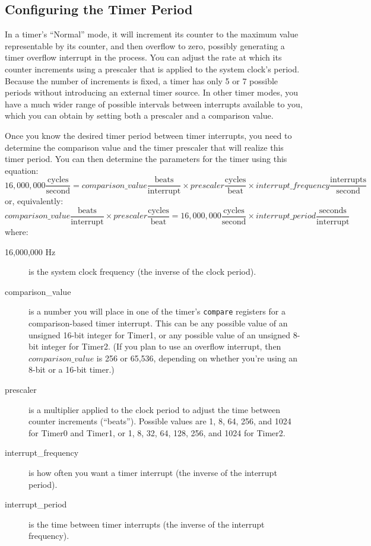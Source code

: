 \subsection{Configuring the Timer Period}

In a timer's ``Normal'' mode, it will increment its counter to the maximum value representable by its counter, and then overflow to zero, possibly generating a timer overflow interrupt in the process.
You can adjust the rate at which its counter increments using a prescaler that is applied to the system clock's period.
Because the number of increments is fixed, a timer has only 5 or 7 possible periods without introducing an external timer source.
In other timer modes, you have a much wider range of possible intervals between interrupts available to you, which you can obtain by setting both a prescaler and a comparison value.

Once you know the desired timer period between timer interrupts, you need to determine the comparison value and the timer prescaler that will realize this timer period.
You can then determine the parameters for the timer using
this equation:
\[
    16,000,000 \frac{\mathrm{cycles}}{\mathrm{second}} =
    comparison\_value \frac{\mathrm{beats}}{\mathrm{interrupt}} \times
    prescaler \frac{\mathrm{cycles}}{\mathrm{beat}} \times
    interrupt\_frequency \frac{\mathrm{interrupts}}{\mathrm{second}}
\]
or, equivalently:
\[
    comparison\_value \frac{\mathrm{beats}}{\mathrm{interrupt}} \times
    prescaler \frac{\mathrm{cycles}}{\mathrm{beat}} =
    16,000,000 \frac{\mathrm{cycles}}{\mathrm{second}} \times
    interrupt\_period \frac{\mathrm{seconds}}{\mathrm{interrupt}}
\]
where:
\begin{description}
    \item [16,000,000 Hz] is the system clock frequency (the inverse of the clock period).
    \item [comparison\_value] is a number you will place in one of the timer's \texttt{compare} registers for a comparison-based timer interrupt.
        This can be any possible value of an unsigned 16-bit integer for Timer1, or any possible value of an unsigned 8-bit integer for Timer2.
        (If you plan to use an overflow interrupt, then $comparison\_value$ is 256 or 65,536, depending on whether you're using an 8-bit or a 16-bit timer.)
    \item [prescaler] is a multiplier applied to the clock period to adjust the time between counter increments (``beats'').
        Possible values are 1, 8, 64, 256, and 1024 for Timer0 and Timer1, or 1, 8, 32, 64, 128, 256, and 1024 for Timer2.
    \item [interrupt\_frequency] is how often you want a timer interrupt (the inverse of the interrupt period).
    \item [interrupt\_period] is the time between timer interrupts (the inverse of the interrupt frequency).
\end{description}

